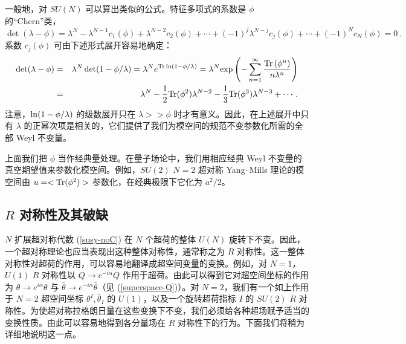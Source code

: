 一般地，对 $SU(N)$ 可以算出类似的公式。特征多项式的系数是 $\phi$ 的“Chern”类，
$$
\det(\lambda-\phi)=\lambda^N -\lambda^{N-1} c_{1}(\phi)+
\lambda^{N-2}c_{2}(\phi)+\cdots +(-1)^{j} \lambda^{N-j} c_{j} (\phi )+
\cdots + (-1)^N c_N(\phi)= 0\,.
$$
系数 $c_j(\phi)$ 可由下述形式展开容易地确定：
\begin{eqnarray}
\det(\lambda -\phi) &=& \lambda^N \det (1-\phi/\lambda) =
\lambda^N e^{{\rm Tr\,ln}(1-\phi/\lambda)} 
=\lambda^N {\rm exp}\left(-\sum_{n=1}^\infty \frac{{\rm Tr}\,(\phi^n)}
{n\lambda^n}\right) \nonumber \\
&=& \lambda^N - \frac{1}{2}{\rm Tr}(\phi^2)\lambda^{N-2} -\frac{1}{3}
{\rm Tr}(\phi^3) \lambda^{N-3}+\cdots\,. \nonumber
\end{eqnarray} 
注意，${\rm ln} (1-\phi/\lambda)$ 的级数展开只在 $\lambda >> \phi$ 时才有意义。因此，在上述展开中只有 $\lambda$ 的正幂次项是相关的，它们提供了我们为模空间的规范不变参数化所需的全部 Weyl 不变量。

上面我们把 $\phi$ 当作经典量处理。在量子场论中，我们用相应经典 Weyl 不变量的真空期望值来参数化模空间。例如，$SU(2)\,\,N=2$ 超对称 Yang--Mills 理论的模空间由 $u=<{\rm Tr}(\phi^2)>$ 参数化，在经典极限下它化为 $a^2/2$。


\subsection{$R$ 对称性及其破缺}

$N$ 扩展超对称代数 (\ref{susy-noC}) 在 $N$ 个超荷的整体 $U(N)$ 旋转下不变。因此，一个超对称理论也应当表现出这种整体对称性，通常称之为 $R$ 对称性。这一整体对称性对超荷的作用，可以容易地翻译成超空间变量的变换。例如，对 $N=1$，$U(1)$ $R$ 对称性以 $Q\rightarrow e^{-i\alpha}Q$ 作用于超荷。由此可以得到它对超空间坐标的作用为 $\theta\rightarrow e^{i\alpha}\theta$ 与 $\bar\theta\rightarrow e^{-i\alpha}\bar\theta$（见 (\ref{superspace-Q})）。对 $N=2$，我们有一个如上作用于 $N=2$ 超空间坐标 $\theta^I, \bar\theta_I$ 的 $U(1)$，以及一个旋转超荷指标 $I$ 的 $SU(2)$ $R$ 对称性。为使超对称拉格朗日量在这些变换下不变，我们必须给各种超场赋予适当的变换性质。由此可以容易地得到各分量场在 $R$ 对称性下的行为。下面我们将稍为详细地说明这一点。


